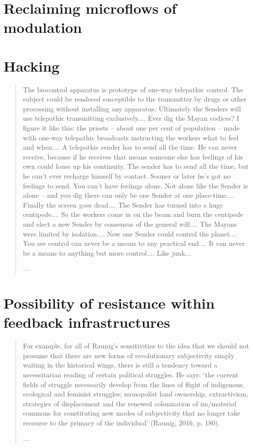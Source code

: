 \section{Reclaiming microflows of modulation}
\section{Hacking}

\begin{quote}
	The biocontrol apparatus is prototype of one-way telepathic control. The subject could be rendered susceptible to the transmitter by drugs or other processing without installing any apparatus. Ultimately the Senders will use telepathic transmitting exclusively.... Ever dig the Mayan codices? I figure it like this: the priests -- about one per cent of population -- made with one-way telepathic broadcasts instructing the workers what to feel and when.... A telepathic sender has to send all the time. He can never receive, because if he receives that means someone else has feelings of his own could louse up his continuity. The sender has to send all the time, but he can't ever recharge himself by contact. Sooner or later he's got no feelings to send. You can't have feelings alone. Not alone like the Sender is alone -- and you dig there can only be one Sender at one place-time.... Finally the screen goes dead.... The Sender has turned into a huge centipede.... So the workers come in on the beam and burn the centipede and elect a new Sender by consensus of the general will.... The Mayans were limited by isolation.... Now one Sender could control the planet.... You see control can never be a means to any practical end.... It can never be a means to anything but more control.... Like junk...

	— \cite[81]{burroughs1992}
\end{quote}



\section{Possibility of resistance within feedback infrastructures}

\begin{quote}
	For example, for all of Raunig’s sensitivities to the idea that we should  not presume that there are new forms of revolutionary subjectivity simply waiting  in the historical wings, there is still a tendency toward a necessitarian reading of  certain political struggles. He says: ‘the current fields of struggle necessarily  develop from the lines of flight of indigenous, ecological and feminist struggles;  monopolist land ownership, extractivism, strategies of displacement and the  renewed colonization of im/material commons for constituting new modes of  subjectivity that no longer take recourse to the primacy of the individual’ (Raunig,  2016, p. 180).

	— \cite[25]{mackenzie2021}
\end{quote}


